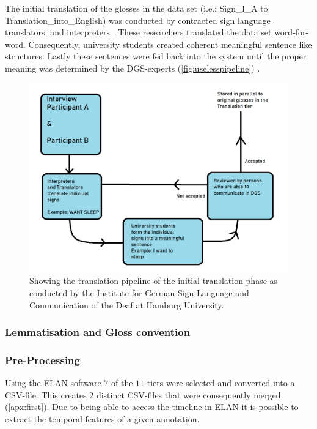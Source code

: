 The initial translation of the glosses in the data set (i.e.: Sign\_l\_A to Translation\_into\_English) was conducted by contracted sign language translators, and interpreters \cite{konradoffentliches}. These researchers translated the data set word-for-word. Consequently, university students created coherent meaningful sentence like structures. Lastly these sentences were fed back into the system until the proper meaning was determined by the DGS-experts (\autoref{fig:uselesspipeline}) \cite{konradoffentliches}.

\begin{figure}[h]
 \centering 
 \includegraphics[width=14cm]{Bachelor CSAI thesis template/images/translation_pipeline.png}
 \caption{Showing the translation pipeline of the initial translation phase as conducted by the Institute for German Sign Language and Communication of the Deaf at Hamburg University. \cite{konradoffentliches} }
 \label{fig:uselesspipeline}
\end{figure}

\subsubsection{Lemmatisation and Gloss convention}

\subsubsection{Pre-Processing}
Using the ELAN-software $7$ of the $11$ tiers were selected and converted into a CSV-file. This creates $2$ distinct CSV-files that were consequently merged (\autoref{apx:first}). Due to being able to access the timeline in ELAN it is possible to extract the temporal features of a given annotation.
 



